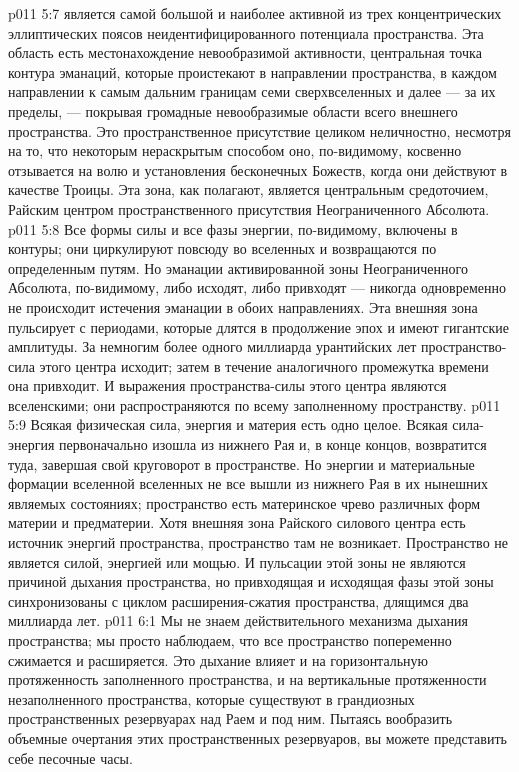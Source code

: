 \vs p011 5:7 \pc {} является самой большой и наиболее активной из трех концентрических эллиптических поясов неидентифицированного потенциала пространства. Эта область есть местонахождение невообразимой активности, центральная точка контура эманаций, которые проистекают в направлении пространства, в каждом направлении к самым дальним границам семи сверхвселенных и далее --- за их пределы, --- покрывая громадные невообразимые области всего внешнего пространства. Это пространственное присутствие целиком неличностно, несмотря на то, что некоторым нераскрытым способом оно, по\hyp{}видимому, косвенно отзывается на волю и установления бесконечных Божеств, когда они действуют в качестве Троицы. Эта зона, как полагают, является центральным средоточием, Райским центром пространственного присутствия Неограниченного Абсолюта.
\vs p011 5:8 Все формы силы и все фазы энергии, по\hyp{}видимому, включены в контуры; они циркулируют повсюду во вселенных и возвращаются по определенным путям. Но эманации активированной зоны Неограниченного Абсолюта, по\hyp{}видимому, либо исходят, либо привходят --- никогда одновременно не происходит истечения эманации в обоих направлениях. Эта внешняя зона пульсирует с периодами, которые длятся в продолжение эпох и имеют гигантские амплитуды. За немногим более одного миллиарда урантийских лет пространство\hyp{}сила этого центра исходит; затем в течение аналогичного промежутка времени она привходит. И выражения пространства\hyp{}силы этого центра являются вселенскими; они распространяются по всему заполненному пространству.
\vs p011 5:9 \pc Всякая физическая сила, энергия и материя есть одно целое. Всякая сила\hyp{}энергия первоначально изошла из нижнего Рая и, в конце концов, возвратится туда, завершая свой круговорот в пространстве. Но энергии и материальные формации вселенной вселенных не все вышли из нижнего Рая в их нынешних являемых состояниях; пространство есть материнское чрево различных форм материи и предматерии. Хотя внешняя зона Райского силового центра есть источник энергий пространства, пространство там не возникает. Пространство не является силой, энергией или мощью. И пульсации этой зоны не являются причиной дыхания пространства, но привходящая и исходящая фазы этой зоны синхронизованы с циклом расширения\hyp{}сжатия пространства, длящимся два миллиарда лет.
\vs p011 6:1 Мы не знаем действительного механизма дыхания пространства; мы просто наблюдаем, что все пространство попеременно сжимается и расширяется. Это дыхание влияет и на горизонтальную протяженность заполненного пространства, и на вертикальные протяженности незаполненного пространства, которые существуют в грандиозных пространственных резервуарах над Раем и под ним. Пытаясь вообразить объемные очертания этих пространственных резервуаров, вы можете представить себе песочные часы.
